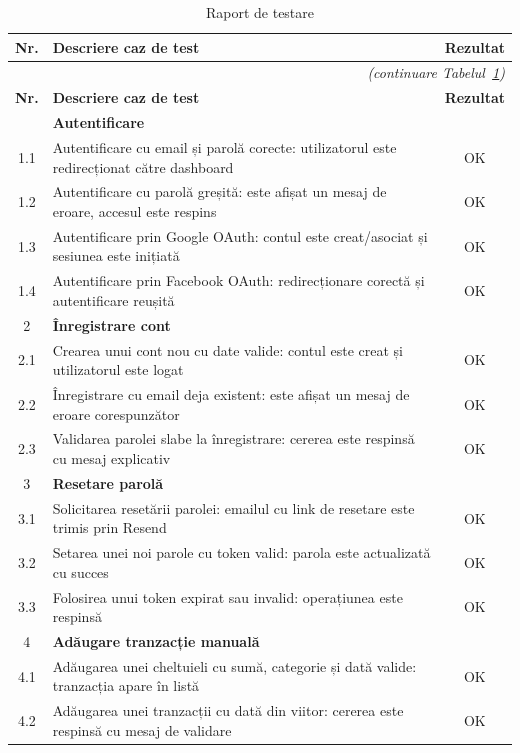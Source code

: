 \documentclass[12pt,a4paper,oneside]{report}
\begin{document}
\begin{center}
\begin{longtable}{|c|p{11cm}|c|}
\caption{Raport de testare}\label{tab:raport-testare}\\
\hline
\textbf{Nr.} & \textbf{Descriere caz de test} & \textbf{Rezultat} \\
\hline
\endfirsthead
\multicolumn{3}{r}{\textit{(continuare Tabelul~\ref{tab:raport-testare})}}\\
\hline
\textbf{Nr.} & \textbf{Descriere caz de test} & \textbf{Rezultat} \\
\hline
\endhead
\hline
\endfoot
\hline
\endlastfoot
1 & \textbf{Autentificare} & \\
\hline
1.1 & Autentificare cu email și parolă corecte: utilizatorul este redirecționat către dashboard & OK \\
\hline
1.2 & Autentificare cu parolă greșită: este afișat un mesaj de eroare, accesul este respins & OK \\
\hline
1.3 & Autentificare prin Google OAuth: contul este creat/asociat și sesiunea este inițiată & OK \\
\hline
1.4 & Autentificare prin Facebook OAuth: redirecționare corectă și autentificare reușită & OK \\
\hline
2 & \textbf{Înregistrare cont} & \\
\hline
2.1 & Crearea unui cont nou cu date valide: contul este creat și utilizatorul este logat & OK \\
\hline
2.2 & Înregistrare cu email deja existent: este afișat un mesaj de eroare corespunzător & OK \\
\hline
2.3 & Validarea parolei slabe la înregistrare: cererea este respinsă cu mesaj explicativ & OK \\
\hline
3 & \textbf{Resetare parolă} & \\
\hline
3.1 & Solicitarea resetării parolei: emailul cu link de resetare este trimis prin Resend & OK \\
\hline
3.2 & Setarea unei noi parole cu token valid: parola este actualizată cu succes & OK \\
\hline
3.3 & Folosirea unui token expirat sau invalid: operațiunea este respinsă & OK \\
\hline
4 & \textbf{Adăugare tranzacție manuală} & \\
\hline
4.1 & Adăugarea unei cheltuieli cu sumă, categorie și dată valide: tranzacția apare în listă & OK \\
\hline
4.2 & Adăugarea unei tranzacții cu dată din viitor: cererea este respinsă cu mesaj de validare & OK \\

\end{longtable}
\end{center}
\end{document}

